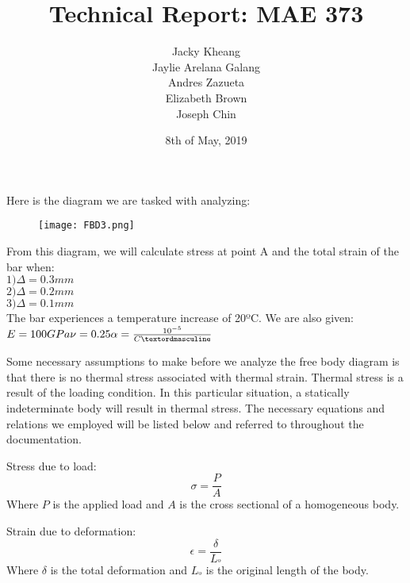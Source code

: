 \documentclass[12pt]{article}
\title{Technical Report: MAE 373}
\author{Jacky Kheang\\Jaylie Arelana Galang\\Andres Zazueta\\Elizabeth Brown\\Joseph Chin}
\date{8th of May, 2019}
\begin{document}
\begin{titlepage}
\maketitle
\end{titlepage}

Here is the diagram we are tasked with analyzing:
\newline

\begin{figure}[h!]
	\texttt{[image: FBD3.png]}
\end{figure}
From this diagram, we will calculate stress at point A and the total strain of the bar when:\\
\indent$1) \Delta = 0.3 mm$\\	
\indent$2) \Delta = 0.2 mm$\\ 
\indent$3) \Delta = 0.1 mm$\\

The bar experiences a temperature increase of 20ºC. We are also given:\\
$E=100 GPa\\
\nu=0.25\\
\alpha=\frac{10^{-5}}{Cº}$
\pagebreak

Some necessary assumptions to make before we analyze the free body diagram is that there is no thermal stress associated with thermal strain. Thermal stress is a result of the loading condition. In this particular situation, a statically indeterminate body will result in thermal stress. The necessary equations and relations we employed will be listed below and referred to throughout the documentation.
\newline

Stress due to load:
\begin{equation} \label{stress}
\sigma=\frac{P}{A}
\end{equation}
Where $P$ is the applied load and $A$ is the cross sectional of a homogeneous body.
\newline

Strain due to deformation:
\begin{equation} \label{strain}
\epsilon=\frac{\delta}{L_{º}}
\end{equation}
Where $\delta$ is the total deformation and $L_{º}$ is the original length of the body.
\newline
\end{document}

